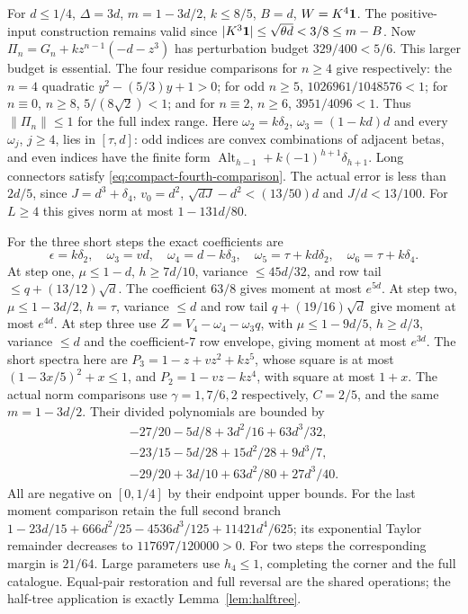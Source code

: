 For $d\le1/4$, $\Delta=3d$, $m=1-3d/2$, $k\le8/5$, $B=d$, $W=K^4\mathbf1$.
The positive-input construction remains valid since
$|K^3\mathbf1|\le\sqrt{\theta d}<3/8\le m-B$.
Now $\Pi_n=G_n+kz^{n-1}(-d-z^3)$ has perturbation budget
$329/400<5/6$. This larger budget is essential.
The four residue comparisons for $n\ge4$ give respectively:
the $n=4$ quadratic $y^2-(5/3)y+1>0$;
for odd $n\ge5$, $1026961/1048576<1$;
for $n\equiv0$, $n\ge8$, $5/(8\sqrt2)<1$;
and for $n\equiv2$, $n\ge6$, $3951/4096<1$.
Thus $\|\Pi_n\|\le1$ for the full index range.
Here $\omega_2=k\delta_{2}$, $\omega_3=(1-kd)d$ and every $\omega_j$, $j\ge4$,
lies in $[\tau,d]$: odd indices are convex combinations of adjacent betas,
and even indices have the finite form
$\operatorname{Alt}_{h-1}+k(-1)^{h+1}\delta_{h+1}$.
Long connectors satisfy \eqref{eq:compact-fourth-comparison}.
The actual error is less than $2d/5$, since $J=d^3+\delta_{4}$, $v_0=d^2$,
$\sqrt{dJ}-d^2<(13/50)d$ and $J/d<13/100$.
For $L\ge4$ this gives norm at most $1-131d/80$.

For the three short steps the exact coefficients are
\[
 \epsilon=k\delta_{2},\quad\omega_3=vd,\quad\omega_4=d-k\delta_{3},\quad
 \omega_5=\tau+kd\delta_{2},\quad\omega_6=\tau+k\delta_{4}.
\]
At step one, $\mu\le1-d$, $h\ge7d/10$,
variance $\le45d/32$, and row tail $\le q+(13/12)\sqrt d$.
The coefficient $63/8$ gives moment at most $e^{5d}$.
At step two, $\mu\le1-3d/2$, $h=\tau$, variance $\le d$ and
row tail $q+(19/16)\sqrt d$ give moment at most $e^{4d}$.
At step three use $Z=V_4-\omega_4-\omega_3q$, with
$\mu\le1-9d/5$, $h\ge d/3$, variance $\le d$ and the coefficient-$7$
row envelope, giving moment at most $e^{3d}$.
The short spectra here are $P_3=1-z+vz^2+kz^5$, whose square is at most
$(1-3x/5)^2+x\le1$, and $P_2=1-vz-kz^4$, with square at most $1+x$.
The actual norm comparisons use $\gamma=1,7/6,2$ respectively,
$C=2/5$, and the same $m=1-3d/2$.
Their divided polynomials are bounded by
\begin{gather*}
 -27/20-5d/8+3d^2/16+63d^3/32,\\
 -23/15-5d/28+15d^2/28+9d^3/7,\\
 -29/20+3d/10+63d^2/80+27d^3/40.
\end{gather*}
All are negative on $[0,1/4]$ by their endpoint upper bounds.
For the last moment comparison retain the full second branch
$1-23d/15+666d^2/25-4536d^3/125+11421d^4/625$;
its exponential Taylor remainder decreases to $117697/120000>0$.
For two steps the corresponding margin is $21/64$.
Large parameters use $h_4\le1$, completing the corner and the full catalogue.
Equal-pair restoration and full reversal are the shared operations;
the half-tree application is exactly Lemma~\ref{lem:halftree}.
